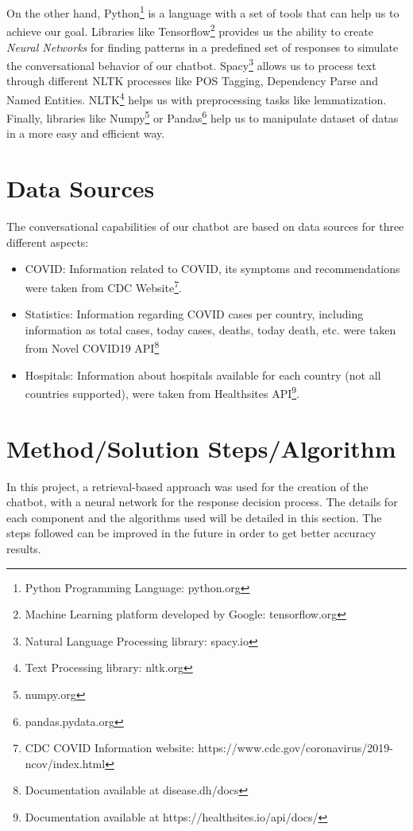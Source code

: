 \documentclass[]{article}
\begin{document}
On the other hand, Python\footnote{Python Programming Language: python.org} is a language with a set of tools that can help us to achieve our goal. Libraries like Tensorflow\footnote{Machine Learning platform developed by Google: tensorflow.org} provides us the ability to create \emph{Neural Networks} for finding patterns in a predefined set of responses to simulate the conversational behavior of our chatbot. Spacy\footnote{Natural Language Processing library: spacy.io} allows us to process text through different NLTK processes like POS Tagging, Dependency Parse and Named Entities. NLTK\footnote{Text Processing library: nltk.org} helps us with preprocessing tasks like lemmatization. Finally, libraries like Numpy\footnote{numpy.org} or Pandas\footnote{pandas.pydata.org} help us to manipulate dataset of datas in a more easy and efficient way.


\section{Data Sources}

The conversational capabilities of our chatbot are based on data sources for three different aspects:

\begin{itemize}
  \item COVID: Information related to COVID, its symptoms and recommendations were taken from CDC Website\footnote{CDC COVID Information website: https://www.cdc.gov/coronavirus/2019-ncov/index.html}.
  \item Statistics: Information regarding COVID cases per country, including information as total cases, today cases, deaths, today death, etc. were taken from Novel COVID19 API\footnote{Documentation available at disease.dh/docs}
  \item Hospitals: Information about hospitals available for each country (not all countries supported), were taken from Healthsites API\footnote{Documentation available at https://healthsites.io/api/docs/}.
\end{itemize}

\section{Method/Solution Steps/Algorithm}

In this project, a retrieval-based approach was used for the creation of the chatbot, with a neural network for the response decision process. The details for each component and the algorithms used will be detailed in this section. The steps followed can be improved in the future in order to get better accuracy results.
\end{document}
